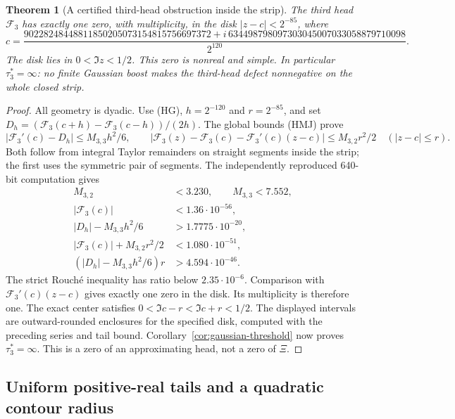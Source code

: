 \documentclass[11pt]{article}
\newtheorem{theorem}{Theorem}
\theoremstyle{remark}\newtheorem{remark}[theorem]{Remark}
\begin{document}
\begin{theorem}[A certified third-head obstruction inside the strip]
\label{thm:third-head-certificate}
The third head $\mathcal F_3$ has exactly one zero, with multiplicity,
in the disk $|z-c|<2^{-85}$, where
\[
 c=\frac{
 90228248448811850205073154815756697372+
 i\,634498798097303045007033058879710098}{2^{120}}.
\]
The disk lies in $0<\Im z<1/2$.
This zero is nonreal and simple. In particular $\tau_3^*=\infty$:
no finite Gaussian boost makes the third-head defect nonnegative
on the whole closed strip.
\end{theorem}
\begin{proof}
All geometry is dyadic. Use (HG), $h=2^{-120}$ and
$r=2^{-85}$, and set
$D_h=(\mathcal F_3(c+h)-\mathcal F_3(c-h))/(2h)$.
The global bounds (HMJ) prove
\[
 |\mathcal F_3'(c)-D_h|\le M_{3,3}h^2/6,\qquad
 |\mathcal F_3(z)-\mathcal F_3(c)-\mathcal F_3'(c)(z-c)|
          \le M_{3,2}r^2/2 \quad(|z-c|\le r).
\]
Both follow from integral Taylor remainders on straight segments
inside the strip; the first uses the symmetric pair of segments.
The independently reproduced 640-bit computation gives
\[
 \begin{split}
 M_{3,2}&<3.230,\qquad M_{3,3}<7.552,\\
 |\mathcal F_3(c)|&<1.36\cdot10^{-56},\\
 |D_h|-M_{3,3}h^2/6&>1.7775\cdot10^{-20},\\
 |\mathcal F_3(c)|+M_{3,2}r^2/2&<1.080\cdot10^{-51},\\
 (|D_h|-M_{3,3}h^2/6)r&>4.594\cdot10^{-46}.
 \end{split}
\]
The strict Rouch\'e inequality has ratio below $2.35\cdot10^{-6}$.
Comparison with $\mathcal F_3'(c)(z-c)$ gives exactly one zero
in the disk. Its multiplicity is therefore one.
The exact center satisfies $0<\Im c-r<\Im c+r<1/2$.
The displayed intervals are outward-rounded enclosures for the
specified disk, computed with the preceding series and tail bound.
Corollary~\ref{cor:gaussian-threshold} now proves $\tau_3^*=\infty$.
This is a zero of an approximating head, not a zero of $\Xi$.
\end{proof}

\subsection{Uniform positive-real tails and a quadratic contour radius}
\end{document}
